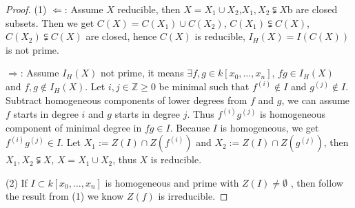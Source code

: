 \documentclass{amsart}
\theoremstyle{plain}
\theoremstyle{definition}
\theoremstyle{remark}
\numberwithin{equation}{section}
\begin{document}
\begin{proof}
	(1) $ \Leftarrow $: Assume $ X $ reducible, then $ X=X_1\cup X_2 $,$ X_1,X_2\subsetneqq X $b are closed subsets. Then we get $ C(X)=C(X_1)\cup C(X_2) $, $ C(X_1)\subsetneqq C(X) $,$ C(X_2)\subsetneqq C(X) $ are closed, hence  $ C(X) $ is reducible, $ I_H(X)=I(C(X)) $ is not prime.

	$ \Rightarrow $: Assume $ I_H(X) $ not prime, it means $ \exists f,g\in k[x_0,\dots,x_n] $, $ fg\in I_H(X) $ and $ f,g\not\in I_H(X) $. Let $ i,j\in\mathbb{Z}\geq 0 $ be minimal such that $ f^{(i)}\not\in I $ and $ g^{(j)}\not\in I $. Subtract homogeneous components of lower degrees from $ f $ and $ g $, we can assume $ f $ starts in degree $ i $ and $ g $ starts in degree $ j $. Thus $ f^{(i)}g^{(j)} $  is homogeneous component of minimal degree in $ fg\in I $. Because $ I $ is homogeneous,  we get $ f^{(i)}g^{(j)} \in I$. Let
	$ X_1:=Z(I)\cap Z(f^(i)) $ and $ X_2:=Z(I)\cap Z(g^{(j)}) $, then $ X_1,X_2\subsetneqq X $, $ X=X_1\cup X_2 $, thus $ X $ is reducible.

	(2) If $ I\subset k[x_0,\dots,x_n] $ is homogeneous and prime with $ Z(I)\neq\emptyset $ , then follow the result from (1) we know $ Z(f) $ is irreducible.
\end{proof}
\end{document}
